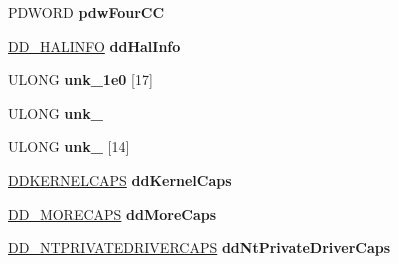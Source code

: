 \begin{DoxyCompactItemize}
P\+D\+W\+O\+RD {\bfseries pdw\+Four\+CC}
\item 
\mbox{\label{struct___e_d_d___d_i_r_e_c_t_d_r_a_w___g_l_o_b_a_l_a6567196f193c0da51f8c819167b36fed}} 
\hyperlink{struct___d_d___h_a_l_i_n_f_o}{D\+D\+\_\+\+H\+A\+L\+I\+N\+FO} {\bfseries dd\+Hal\+Info}
\item 
\mbox{\label{struct___e_d_d___d_i_r_e_c_t_d_r_a_w___g_l_o_b_a_l_a75145b7de49b2f0c43e6ccca55e18314}} 
U\+L\+O\+NG {\bfseries unk\+\_\+1e0} \mbox{[}17\mbox{]}
\item 
\mbox{\label{struct___e_d_d___d_i_r_e_c_t_d_r_a_w___g_l_o_b_a_l_ad21c3d61035d02112ef7a3439773988e}} 
U\+L\+O\+NG {\bfseries unk\+\_}
\item 
\mbox{\label{struct___e_d_d___d_i_r_e_c_t_d_r_a_w___g_l_o_b_a_l_a00cee7638de950a2216c99d396b4f07d}} 
U\+L\+O\+NG {\bfseries unk\+\_} \mbox{[}14\mbox{]}
\item 
\mbox{\label{struct___e_d_d___d_i_r_e_c_t_d_r_a_w___g_l_o_b_a_l_aa8866a141a65dc37211728f16d08d11b}} 
\hyperlink{struct___d_d_k_e_r_n_e_l_c_a_p_s}{D\+D\+K\+E\+R\+N\+E\+L\+C\+A\+PS} {\bfseries dd\+Kernel\+Caps}
\item 
\mbox{\label{struct___e_d_d___d_i_r_e_c_t_d_r_a_w___g_l_o_b_a_l_a3551c0bbb25609eb4efa3dc19b4fa7d9}} 
\hyperlink{struct___d_d___m_o_r_e_c_a_p_s}{D\+D\+\_\+\+M\+O\+R\+E\+C\+A\+PS} {\bfseries dd\+More\+Caps}
\item 
\mbox{\label{struct___e_d_d___d_i_r_e_c_t_d_r_a_w___g_l_o_b_a_l_a07d8ce8d89d5b49a4036beb0e15c2ebf}} 
\hyperlink{struct_d_d___n_t_p_r_i_v_a_t_e_d_r_i_v_e_r_c_a_p_s}{D\+D\+\_\+\+N\+T\+P\+R\+I\+V\+A\+T\+E\+D\+R\+I\+V\+E\+R\+C\+A\+PS} {\bfseries dd\+Nt\+Private\+Driver\+Caps}
\item 
\mbox{\label{struct___e_d_d___d_i_r_e_c_t_d_r_a_w___g_l_o_b_a_l_ae3aed52fa1e3b2bdf872400bb76936cd}} 

\end{DoxyCompactItemize}
